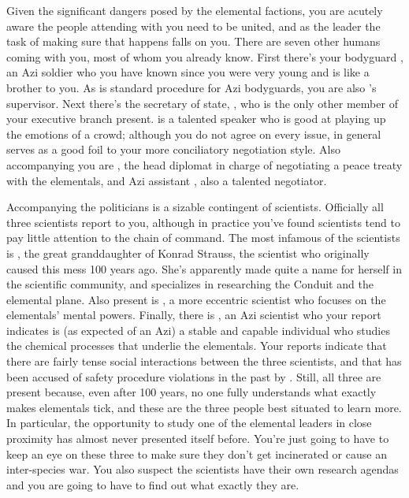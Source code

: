 \documentclass[char]{elementals}
\begin{document}
Given the significant dangers posed by the elemental factions, you are acutely aware the people attending with you need to be united, and as the leader the task of making sure that happens falls on you. There are seven other humans coming with you, most of whom you already know. First there's your bodyguard \cRomeo{\intro}, an Azi soldier who you have known since you were very young and is like a brother to you. As is standard procedure for Azi bodyguards, you are also \cRomeo{}'s supervisor. Next there's the secretary of state, \cDema{\intro}, who is the only other member of your executive branch present. \cDema{\They} is a talented speaker who is good at playing up the emotions of a crowd; although you do not agree on every issue, in general \cDema{\they} serves as a good foil to your more conciliatory negotiation style. Also accompanying you are \cAvatar{\intro}, the head diplomat in charge of negotiating a peace treaty with the elementals, and \cAvatar{\their} Azi assistant \cDiplomat{\intro}, also a talented negotiator.

Accompanying the politicians is a sizable contingent of scientists. Officially all three scientists report to you, although in practice you've found scientists tend to pay little attention to the chain of command. The most infamous of the scientists is \cGD{\intro}, the great granddaughter of Konrad Strauss, the scientist who originally caused this mess 100 years ago. She's apparently made quite a name for herself in the scientific community, and specializes in researching the Conduit and the elemental plane. Also present is \cMS{\intro}, a more eccentric scientist who focuses on the elementals' mental powers. Finally, there is \cScientist{\intro}, an Azi scientist who your report indicates is (as expected of an Azi) a stable and capable individual who studies the chemical processes that underlie the elementals. Your reports indicate that there are fairly tense social interactions between the three scientists, and that \cMS{} has been accused of safety procedure violations in the past by \cScientist{}. Still, all three are present because, even after 100 years, no one fully understands what exactly makes elementals tick, and these are the three people best situated to learn more. In particular, the opportunity to study one of the elemental leaders in close proximity has almost never presented itself before. You're just going to have to keep an eye on these three to make sure they don't get incinerated or cause an inter-species war. You also suspect the scientists have their own research agendas and you are going to have to find out what exactly they are.
\end{document}
